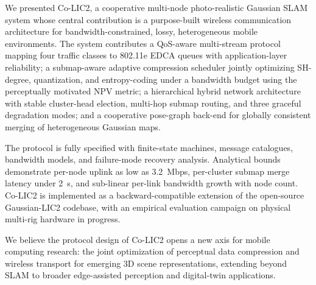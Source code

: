 \label{sec:conclusion}

We presented Co-LIC2, a cooperative multi-node photo-realistic Gaussian
SLAM system whose central contribution is a purpose-built wireless
communication architecture for bandwidth-constrained, lossy, heterogeneous
mobile environments. The system contributes a QoS-aware multi-stream protocol
mapping four traffic classes to 802.11e EDCA queues with application-layer
reliability; a submap-aware adaptive compression scheduler jointly optimizing
SH-degree, quantization, and entropy-coding under a bandwidth budget using
the perceptually motivated NPV metric; a hierarchical hybrid network
architecture with stable cluster-head election, multi-hop submap routing,
and three graceful degradation modes; and a cooperative pose-graph back-end
for globally consistent merging of heterogeneous Gaussian maps.

The protocol is fully specified with finite-state machines, message
catalogues, bandwidth models, and failure-mode recovery analysis. Analytical
bounds demonstrate per-node uplink as low as 3.2~Mbps, per-cluster submap
merge latency under 2~s, and sub-linear per-link bandwidth growth with
node count. Co-LIC2 is implemented as a backward-compatible extension of the
open-source Gaussian-LIC2 codebase, with an empirical evaluation campaign
on physical multi-rig hardware in progress.

We believe the protocol design of Co-LIC2 opens a new axis for mobile
computing research: the joint optimization of perceptual data compression
and wireless transport for emerging 3D scene representations, extending
beyond SLAM to broader edge-assisted perception and digital-twin
applications.

